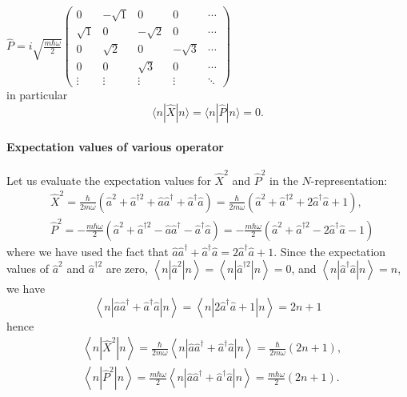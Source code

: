 \begin{enumerate}
 	$\hat{P}=i \sqrt{\frac{m \hbar \omega}{2}}\left(\begin{array}{ccccc}
 		0 & -\sqrt{1} & 0 & 0 & \cdots \\
 		\sqrt{1} & 0 & -\sqrt{2} & 0 & \cdots \\
 		0 & \sqrt{2} & 0 & -\sqrt{3} & \cdots \\
 		0 & 0 & \sqrt{3} & 0 & \cdots \\
 		\vdots & \vdots & \vdots & \vdots & \ddots
 	\end{array}\right)$\\
 	in particular
 	$$
 	\langle n|\hat{X}| n\rangle=\langle n|\hat{P}| n\rangle=0 .
 	$$
 \end{enumerate}
\paragraph{Expectation values of various operator}
Let us evaluate the expectation values for $\hat{X}^{2}$ and $\hat{P}^{2}$ in the $N$-representation:
$$
\begin{aligned}
&\hat{X}^{2}=\frac{\hbar}{2 m \omega}\left(\hat{a}^{2}+\hat{a}^{\dagger 2}+\hat{a} \hat{a}^{\dagger}+\hat{a}^{\dagger} \hat{a}\right)=\frac{\hbar}{2 m \omega}\left(\hat{a}^{2}+\hat{a}^{\dagger 2}+2 \hat{a}^{\dagger} \hat{a}+1\right), \\
&\hat{P}^{2}=-\frac{m \hbar \omega}{2}\left(\hat{a}^{2}+\hat{a}^{\dagger 2}-\hat{a} \hat{a}^{\dagger}-\hat{a}^{\dagger} \hat{a}\right)=-\frac{m \hbar \omega}{2}\left(\hat{a}^{2}+\hat{a}^{\dagger 2}-2 \hat{a}^{\dagger} \hat{a}-1\right)
\end{aligned}
$$
where we have used the fact that $\hat{a} \hat{a}^{\dagger}+\hat{a}^{\dagger} \hat{a}=2 \hat{a}^{\dagger} \hat{a}+1 .$ Since the expectation values of $\hat{a}^{2}$ and $\hat{a}^{\dagger 2}$ are zero, $\left\langle n\left|\hat{a}^{2}\right| n\right\rangle=\left\langle n\left|\hat{a}^{\dagger 2}\right| n\right\rangle=0$, and $\left\langle n\left|\hat{a}^{\dagger} \hat{a}\right| n\right\rangle=n$, we have\\
$$\left\langle n\left|\hat{a} \hat{a}^{\dagger}+\hat{a}^{\dagger} \hat{a}\right| n\right\rangle=\left\langle n\left|2 \hat{a}^{\dagger} \hat{a}+1\right| n\right\rangle=2 n+1$$
hence
$$\begin{aligned}
	&\left\langle n\left|\hat{X}^{2}\right| n\right\rangle=\frac{\hbar}{2 m \omega}\left\langle n\left|\hat{a} \hat{a}^{\dagger}+\hat{a}^{\dagger} \hat{a}\right| n\right\rangle=\frac{\hbar}{2 m \omega}(2 n+1), \\
	&\left\langle n\left|\hat{P}^{2}\right| n\right\rangle=\frac{m \hbar \omega}{2}\left\langle n\left|\hat{a} \hat{a}^{\dagger}+\hat{a}^{\dagger} \hat{a}\right| n\right\rangle=\frac{m \hbar \omega}{2}(2 n+1) .
\end{aligned}$$
